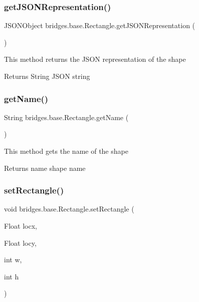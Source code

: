 \subsubsection{\texorpdfstring{getJSONRepresentation()}{getJSONRepresentation()}}
{\footnotesize\ttfamily J\+S\+O\+N\+Object bridges.\+base.\+Rectangle.\+get\+J\+S\+O\+N\+Representation (\begin{DoxyParamCaption}{ }\end{DoxyParamCaption})}

This method returns the J\+S\+ON representation of the shape

\begin{DoxyReturn}{Returns}
String J\+S\+ON string 
\end{DoxyReturn}
\mbox{\label{classbridges_1_1base_1_1_rectangle_ab785b45f264ae3cd61a5a898ffa6afba}} 
\subsubsection{\texorpdfstring{getName()}{getName()}}
{\footnotesize\ttfamily String bridges.\+base.\+Rectangle.\+get\+Name (\begin{DoxyParamCaption}{ }\end{DoxyParamCaption})}

This method gets the name of the shape

\begin{DoxyReturn}{Returns}
name shape name 
\end{DoxyReturn}
\mbox{\label{classbridges_1_1base_1_1_rectangle_a7f071805534af749355f3d6122972ab9}} 
\subsubsection{\texorpdfstring{setRectangle()}{setRectangle()}}
{\footnotesize\ttfamily void bridges.\+base.\+Rectangle.\+set\+Rectangle (\begin{DoxyParamCaption}\item[{Float}]{locx,  }\item[{Float}]{locy,  }\item[{int}]{w,  }\item[{int}]{h }\end{DoxyParamCaption})}

